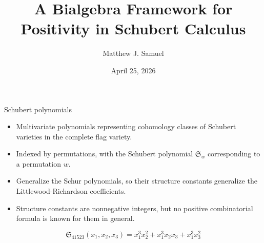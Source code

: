 \documentclass[aspectratio=169]{beamer}
\title{A Bialgebra Framework for Positivity in Schubert Calculus}
\author{Matthew J. Samuel}
\institute{CombinaTexas 2026}
\date{April 25, 2026}
\newcommand{\sch}{\mathfrak{S}}
\begin{document}
\begin{frame}
  \titlepage
\end{frame}

\begin{frame}{Schubert polynomials}
\begin{itemize}
  \item Multivariate polynomials representing cohomology classes of Schubert varieties in the complete flag variety.
  \item Indexed by permutations, with the Schubert polynomial $\sch_w$ corresponding to a permutation $w$.
  \item Generalize the Schur polynomials, so their structure constants generalize the Littlewood-Richardson coefficients.
  \item Structure constants are nonnegative integers, but no positive combinatorial formula is known for them in general.
\end{itemize}
$$\sch_{41523}(x_1,x_2,x_3) = x_{1}^{3} x_{2}^{2} + x_{1}^{3} x_{2} x_{3} + x_{1}^{3} x_{3}^{2}$$
\end{frame}

  

\end{document}

